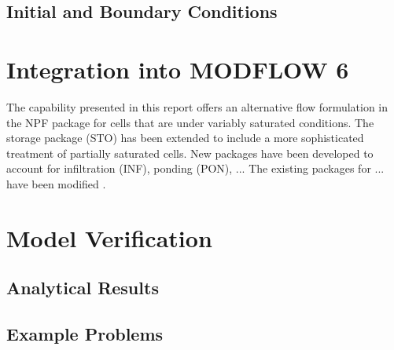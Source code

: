 \documentclass[fleqn]{article}
\begin{document}
\subsection{Initial and Boundary Conditions}

\section{Integration into MODFLOW 6}
The capability presented in this report offers an alternative flow
formulation in the NPF package for cells that are under variably 
saturated conditions. The storage package (STO) has been extended
to include a more sophisticated treatment of partially saturated
cells. New packages have been developed to account for infiltration (INF),
ponding (PON), ... The existing packages for ... have been modified .

\section{Model Verification}
\subsection{Analytical Results}
\subsection{Example Problems}
\end{document}
